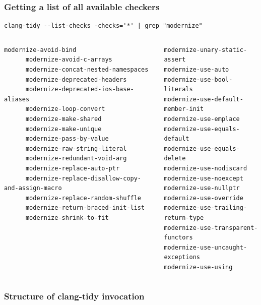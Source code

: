 \documentclass[aspectratio=169]{beamer}
\begin{document}
\begin{frame}[fragile]
\frametitle{Getting a list of all available checkers}
  {\fontsize{10}{6} \begin{lstlisting}[showstringspaces=false]
clang-tidy --list-checks -checks='*' | grep "modernize"
    \end{lstlisting}}

\begin{columns}[T]
  \begin{column}{0.5\textwidth}
    {\fontsize{6}{6} \begin{lstlisting}[showstringspaces=false]
      modernize-avoid-bind
      modernize-avoid-c-arrays
      modernize-concat-nested-namespaces
      modernize-deprecated-headers
      modernize-deprecated-ios-base-aliases
      modernize-loop-convert
      modernize-make-shared
      modernize-make-unique
      modernize-pass-by-value
      modernize-raw-string-literal
      modernize-redundant-void-arg
      modernize-replace-auto-ptr
      modernize-replace-disallow-copy-and-assign-macro
      modernize-replace-random-shuffle
      modernize-return-braced-init-list
      modernize-shrink-to-fit
    \end{lstlisting}}
  \end{column}
  \begin{column}{0.5\textwidth}
    {\fontsize{6}{6} \begin{lstlisting}[showstringspaces=false]
modernize-unary-static-assert
modernize-use-auto
modernize-use-bool-literals
modernize-use-default-member-init
modernize-use-emplace
modernize-use-equals-default
modernize-use-equals-delete
modernize-use-nodiscard
modernize-use-noexcept
modernize-use-nullptr
modernize-use-override
modernize-use-trailing-return-type
modernize-use-transparent-functors
modernize-use-uncaught-exceptions
modernize-use-using
    \end{lstlisting}}
  \end{column}
\end{columns}
\end{frame}

\begin{frame}[fragile]
\frametitle{Structure of clang-tidy invocation}
\end{frame}
\end{document}
